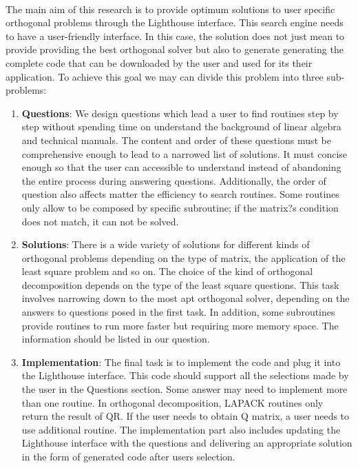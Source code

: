 \documentclass[pdftex,12pt,a4paper]{article}
\begin{document}
\paragraph{}
The main aim of this research is to provide optimum solutions to user specific orthogonal problems through the Lighthouse interface. This search engine needs to have a user-friendly interface. In this case, the solution does not just mean to provide providing the best orthogonal solver but also to generate generating the complete code that can be downloaded by the user and used for its their application. To achieve this goal we may can divide this problem into three sub-problems: 	
\begin{enumerate}
\item \textbf{Questions}: We design questions which lead a user to find routines step by step  without spending time on understand the background of linear algebra and technical manuals. The content and order of these questions must be comprehensive enough to lead to a narrowed list of solutions. It must concise enough so that the user  can accessible to understand instead of abandoning the entire process during answering questions. Additionally, the order of question also affects matter the efficiency to search routines. Some routines only allow to be composed by specific subroutine; if the matrix?s condition does not match, it can not be solved. 
\item \textbf{Solutions}: There is a wide variety of solutions for different kinds of orthogonal problems depending on the type of matrix, the application of the least square problem and so on. The choice of the kind of orthogonal decomposition depends on the type of the least square questions. This task involves narrowing down to the most apt orthogonal solver, depending on the answers to questions posed in the first task. In addition, some subroutines provide routines to run more faster but requiring more memory space. The information should be listed in our question. 
\item \textbf{Implementation}: The final task is to implement the code and plug it into the Lighthouse interface. This code should support all the selections made by the user in the Questions section. Some answer may need to implement more than one routine. In orthogonal decomposition, LAPACK routines only return the result of QR. If the user needs to obtain Q matrix, a user needs to use additional routine. The implementation part also includes updating the Lighthouse interface with the questions and delivering an appropriate solution in the form of generated code after users selection.
\end{enumerate}
\end{document}
